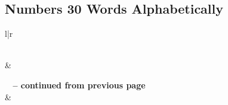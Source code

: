 

\subsection{Numbers 30 Words Alphabetically}


\normalsize
 
\begin{center}
\begin{longtable}{l|r}
\caption[Numbers 30 Words Alphabetically]{Numbers 30 Words Alphabetically}\label{table:WordsAlphabetically for Numbers 30} \\
\hline {} &  \\ \hline 
\endfirsthead
 
{{\bfseries \tablename\ \thetable{} -- continued from previous page}} \\  
\hline {} &  \\ \hline 
\endhead
 

\end{longtable}
\end{center}
